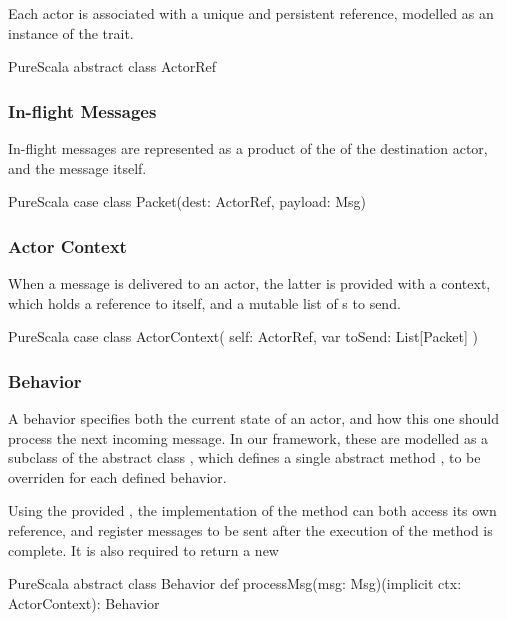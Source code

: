 Each actor is associated with a unique and persistent reference, modelled as an instance of the \ActorRef trait.

\begin{ShortCode}{PureScala}
abstract class ActorRef
\end{ShortCode}

\subsubsection*{In-flight Messages}

In-flight messages are represented as a product of the \ActorRef of the destination actor, and the message itself.

\begin{ShortCode}{PureScala}
case class Packet(dest: ActorRef, payload: Msg)
\end{ShortCode}

\subsubsection*{Actor Context}

When a message is delivered to an actor, the latter is provided with a context,
which holds a reference to itself, and a mutable list of s to send.

\begin{ShortCode}{PureScala}
case class ActorContext(
  self: ActorRef,
  var toSend: List[Packet]
)
\end{ShortCode}

\subsubsection*{Behavior}

A behavior specifies both the current state of an actor, and how this one should 
process the next incoming message. In our framework, these are modelled as a subclass 
of the abstract class , which defines a single abstract method 
, to be overriden for each defined behavior.

Using the provided , the implementation of the 
method can both access its own reference, and register messages to be sent after the
execution of the method is complete. It is also required to return a new 

\begin{ShortCode}{PureScala}
abstract class Behavior {
  def processMsg(msg: Msg)(implicit ctx: ActorContext): Behavior
}
\end{ShortCode}


